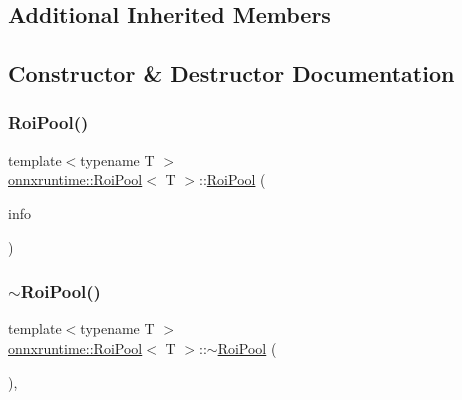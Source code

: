 \subsection*{Additional Inherited Members}


\subsection{Constructor \& Destructor Documentation}
\mbox{\label{classonnxruntime_1_1RoiPool_a1514fc4ca98cf9dd544e0c1a8bfd50d6}} 
\subsubsection{\texorpdfstring{Roi\+Pool()}{RoiPool()}}
{\footnotesize\ttfamily template$<$typename T $>$ \\
\mbox{\hyperlink{classonnxruntime_1_1RoiPool}{onnxruntime\+::\+Roi\+Pool}}$<$ T $>$\+::\mbox{\hyperlink{classonnxruntime_1_1RoiPool}{Roi\+Pool}} (\begin{DoxyParamCaption}\item[{const \mbox{\hyperlink{classonnxruntime_1_1OpKernelInfo}{Op\+Kernel\+Info}} \&}]{info }\end{DoxyParamCaption})\hspace{0.3cm}{\ttfamily [inline]}}

\mbox{\label{classonnxruntime_1_1RoiPool_a6712739433c59b6e53d6fce011045227}} 
\subsubsection{\texorpdfstring{$\sim$\+Roi\+Pool()}{~RoiPool()}}
{\footnotesize\ttfamily template$<$typename T $>$ \\
\mbox{\hyperlink{classonnxruntime_1_1RoiPool}{onnxruntime\+::\+Roi\+Pool}}$<$ T $>$\+::$\sim$\mbox{\hyperlink{classonnxruntime_1_1RoiPool}{Roi\+Pool}} (\begin{DoxyParamCaption}{ }\end{DoxyParamCaption})\hspace{0.3cm}{\ttfamily [override]}, {\ttfamily [default]}}



